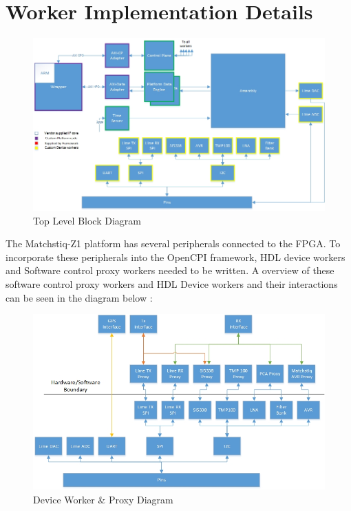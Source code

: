 \documentclass{article}
\begin{document}
\section*{Worker Implementation Details}
\begin{flushleft}
\begin{figure}[ht]
	\centerline{\includegraphics[scale=0.6]{matchstiq_BSP_toplevel}}
	\caption{Top Level Block Diagram}
	\label{fig:top}
\end{figure}

The Matchstiq-Z1 platform has several peripherals connected to the FPGA.  To incorporate these peripherals into the OpenCPI framework, HDL device workers and Software control proxy workers needed to be written.  A overview of these software control proxy workers and HDL Device workers and their interactions can be seen in the diagram below :
\begin{figure}[ht]
	\centerline{\includegraphics[scale=0.6]{matchstiq_BSP_worker}}
	\caption{Device Worker \& Proxy Diagram}
	\label{fig:wkr}
\end{figure}
\newpage

\end{flushleft}
\end{document}
